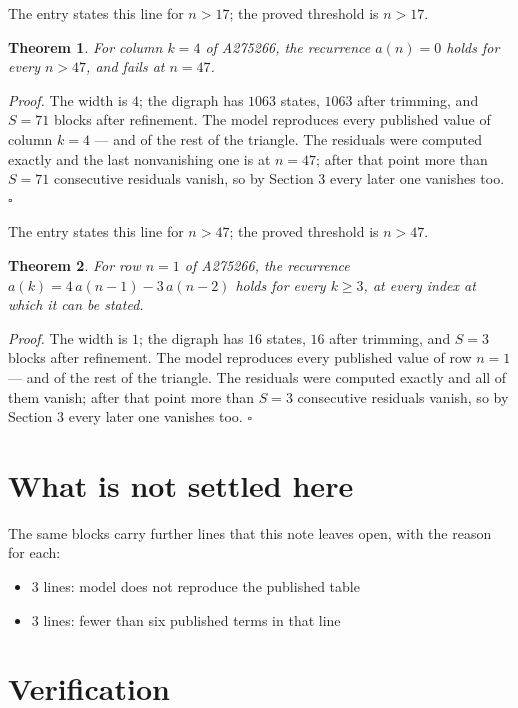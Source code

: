 \documentclass[11pt]{article}
\newtheorem{theorem}{Theorem}
\theoremstyle{definition}
\begin{document}
The entry states this line for $n > 17$; the proved threshold is $n > 17$.

\begin{theorem} For column $k = 4$ of A275266, the recurrence $a(n) = 0$ holds for every $n > 47$, and fails at $n = 47$.\end{theorem}

{\itshape Proof.} The width is $4$; the digraph has $1063$ states, $1063$ after trimming, and $S = 71$ blocks after refinement. The model reproduces every published value of column $k = 4$ --- and of the rest of the triangle. The residuals were computed exactly and the last nonvanishing one is at $n = 47$; after that point more than $S = 71$ consecutive residuals vanish, so by Section 3 every later one vanishes too. $\square$

The entry states this line for $n > 47$; the proved threshold is $n > 47$.

\begin{theorem} For row $n = 1$ of A275266, the recurrence $a(k) = 4\,a(n-1) - 3\,a(n-2)$ holds for every $k \ge 3$, at every index at which it can be stated.\end{theorem}

{\itshape Proof.} The width is $1$; the digraph has $16$ states, $16$ after trimming, and $S = 3$ blocks after refinement. The model reproduces every published value of row $n = 1$ --- and of the rest of the triangle. The residuals were computed exactly and all of them vanish; after that point more than $S = 3$ consecutive residuals vanish, so by Section 3 every later one vanishes too. $\square$

\section{What is not settled here}

The same blocks carry further lines that this note leaves open, with the reason for each:

\begin{itemize}

\item 3 lines: model does not reproduce the published table

\item 3 lines: fewer than six published terms in that line

\end{itemize}

\section{Verification}
\end{document}
